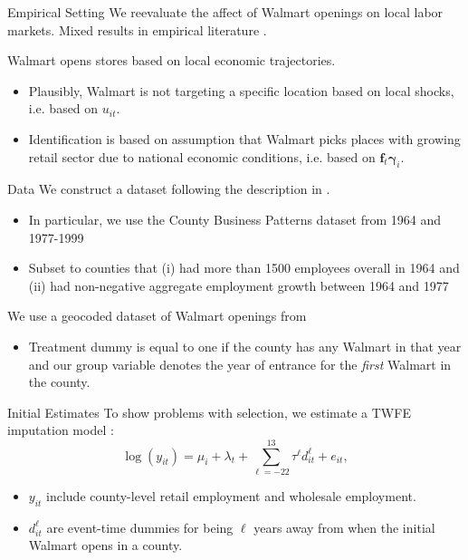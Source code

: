 \documentclass[aspectratio=43,t,11pt]{beamer}
\begin{document}
\begin{frame}{Empirical Setting}
  We reevaluate the affect of Walmart openings on local labor markets. Mixed results in empirical literature .

  \pause\bigskip
  Walmart opens stores based on local economic trajectories.
  \begin{itemize}
    \item Plausibly, Walmart is not targeting a specific location based on local shocks, i.e. based on $u_{it}$.

    \item Identification is based on assumption that Walmart picks places with growing retail sector due to national economic conditions, i.e. based on $\bm{f}_t \bm{\gamma}_i$.
  \end{itemize}
\end{frame}

\begin{frame}{Data}
  We construct a dataset following the description in \citet{basker2005job}.

  \begin{itemize}
    \item In particular, we use the County Business Patterns dataset from 1964 and 1977-1999
    \item Subset to counties that (i) had more than 1500 employees overall in 1964 and (ii) had non-negative aggregate employment growth between 1964 and 1977
  \end{itemize}

  \smallskip\pause
  We use a geocoded dataset of Walmart openings from \citet{arcidiacono2020competitive}

  \begin{itemize}
    \item Treatment dummy is equal to one if the county has any Walmart in that year and our group variable denotes the year of entrance for the \emph{first} Walmart in the county.
  \end{itemize}
\end{frame}

\begin{frame}{Initial Estimates}
  To show problems with selection, we estimate a TWFE imputation model :
  \begin{equation}
      \log(y_{it}) = \mu_i + \lambda_t + \sum_{\ell = -22}^{13} \tau^\ell d_{it}^\ell + e_{it},
  \end{equation}
  \begin{itemize}
    \item $y_{it}$ include county-level retail employment and wholesale employment.
    \item $d_{it}^\ell$ are event-time dummies for being $\ell$ years away from when the initial Walmart opens in a county.
  \end{itemize}
\end{frame}
\end{document}
